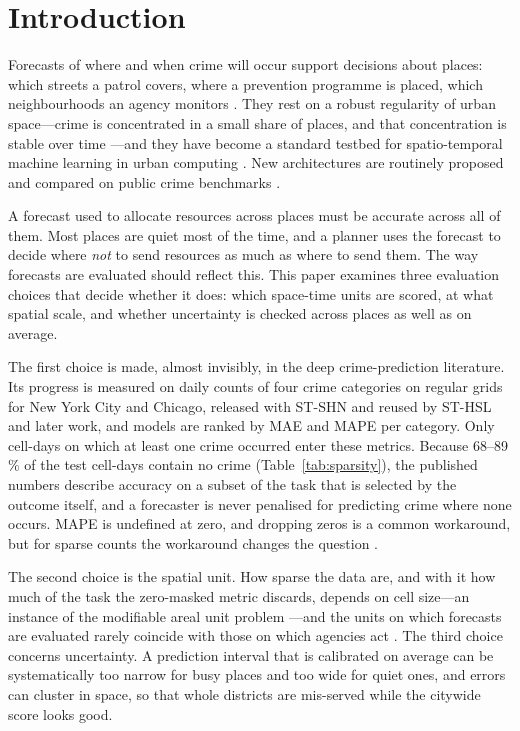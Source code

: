 \documentclass[preprint,12pt,authoryear]{elsarticle}
\begin{document}
\section{Introduction}\label{sec:intro}

Forecasts of where and when crime will occur support decisions about places: which streets a patrol covers, where a prevention programme is placed, which neighbourhoods an agency monitors \citep{mohler2015randomized,kounadi2020systematic}. They rest on a robust regularity of urban space---crime is concentrated in a small share of places, and that concentration is stable over time \citep{weisburd2015law}---and they have become a standard testbed for spatio-temporal machine learning in urban computing \citep{zheng2014urban,zhang2022interpretable}. New architectures are routinely proposed and compared on public crime benchmarks \citep{huang2018deepcrime,xia2021stshn,li2022sthsl,tang2023cl4st}.

A forecast used to allocate resources across places must be accurate across all of them. Most places are quiet most of the time, and a planner uses the forecast to decide where \emph{not} to send resources as much as where to send them. The way forecasts are evaluated should reflect this. This paper examines three evaluation choices that decide whether it does: which space-time units are scored, at what spatial scale, and whether uncertainty is checked across places as well as on average.

The first choice is made, almost invisibly, in the deep crime-prediction literature. Its progress is measured on daily counts of four crime categories on regular grids for New York City and Chicago, released with ST-SHN and reused by ST-HSL and later work, and models are ranked by MAE and MAPE per category. Only cell-days on which at least one crime occurred enter these metrics. Because 68--89\,\% of the test cell-days contain no crime (Table~\ref{tab:sparsity}), the published numbers describe accuracy on a subset of the task that is selected by the outcome itself, and a forecaster is never penalised for predicting crime where none occurs. MAPE is undefined at zero, and dropping zeros is a common workaround, but for sparse counts the workaround changes the question \citep{hyndman2006another,kolassa2016evaluating}.

The second choice is the spatial unit. How sparse the data are, and with it how much of the task the zero-masked metric discards, depends on cell size---an instance of the modifiable areal unit problem \citep{openshaw1984maup}---and the units on which forecasts are evaluated rarely coincide with those on which agencies act \citep{rosser2017predictive}. The third choice concerns uncertainty. A prediction interval that is calibrated on average can be systematically too narrow for busy places and too wide for quiet ones, and errors can cluster in space, so that whole districts are mis-served while the citywide score looks good.
\end{document}

